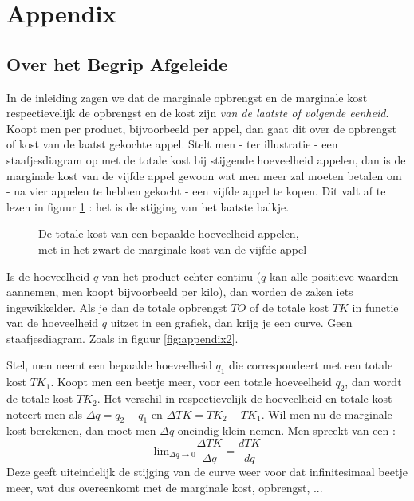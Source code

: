 \section{Appendix}

\subsection{Over het Begrip Afgeleide}\label{sec:appafg}

In de inleiding zagen we dat de marginale opbrengst en de marginale kost respectievelijk de opbrengst en de kost zijn \textit{van de laatste of volgende eenheid}. Koopt men per product, bijvoorbeeld per appel, dan gaat dit over de opbrengst of kost van de laatst gekochte appel. Stelt men - ter illustratie - een staafjesdiagram op met de totale kost bij stijgende hoeveelheid appelen, dan is de marginale kost van de vijfde appel gewoon wat men meer zal moeten betalen om - na vier appelen te hebben gekocht - een vijfde appel te kopen. Dit valt af te lezen in figuur \ref{fig:appendix1} : het is de stijging van het laatste balkje. \\

\begin{figure}[H]
\centering
\captionsetup{justification=centering,margin=2cm}
\caption{De totale kost van een bepaalde hoeveelheid appelen, \\met in het zwart de marginale kost van de vijfde appel}
\label{fig:appendix1}
\end{figure}

\par Is de hoeveelheid $q$ van het product echter continu ($q$ kan alle positieve waarden aannemen, men koopt bijvoorbeeld per kilo), dan worden de zaken iets ingewikkelder. Als je dan de totale opbrengst $TO$ of de totale kost $TK$ in functie van de hoeveelheid $q$ uitzet in een grafiek, dan krijg je een curve. Geen staafjesdiagram. Zoals in figuur \ref{fig:appendix2}. 
\par Stel, men neemt een bepaalde hoeveelheid $q_1$ die correspondeert met een totale kost $TK_1$. Koopt men een beetje meer, voor een totale hoeveelheid $q_2$, dan wordt de totale kost $TK_2$. Het verschil in respectievelijk de hoeveelheid en totale kost noteert men als $\Delta q = q_2-q_1$ en $\Delta TK = TK_2 - TK_1$. Wil men nu de marginale kost berekenen, dan moet men $\Delta q$ oneindig klein nemen. Men spreekt van een  :
$$\text{lim}_{\Delta q\rightarrow 0}\frac{\Delta TK}{\Delta q}=\frac{dTK}{dq}$$
Deze geeft uiteindelijk de stijging van de curve weer voor dat infinitesimaal beetje meer, wat dus overeenkomt met de marginale kost, opbrengst, ...

